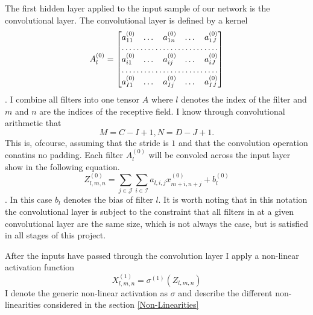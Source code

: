 \documentclass{article}
\begin{document}
The first hidden layer applied to the input sample of our network is the convolutional layer.  The convolutional layer is defined by a kernel 
\begin{equation}
A^{(0)}_l=  \begin{bmatrix}
a^{(0)}_{11}  & \dots & a^{(0)}_{1n}& \dots& a^{(0)}_{1J} \\
\hdotsfor{5} \\
a^{(0)}_{i1}        & \dots& a^{(0)}_{ij} & \dots& a^{(0)}_{iJ}\\
\hdotsfor{5}\\
a^{(0)}_{I1}        & \dots & a^{(0)}_{Ij}& \dots &a^{(0)}_{IJ}
\end{bmatrix}
\end{equation}. I combine all filters into one tensor $A$ where $l$ denotes the index of the filter and $m$ and $n$ are the indices of the receptive field. I know through convolutional arithmetic that 
\begin{equation}
M=C-I+1,
N=D-J+1.
\end{equation} This is, ofcourse, assuming that the stride is $1$ and that the convolution operation conatins no padding.
 Each filter $A^({0})_l$ will be convoled across the input layer show in the following equation.
\begin{equation}
	Z^{(0)}_{l,m,n} = \sum_{j\in \mathcal{J}}\sum_{i \in \mathcal{I}}a_{l,i,j} x^{(0)}_{m+i, n+j}+b^{(0)}_{l}
\end{equation}.  In this case $b_l$ denotes the bias of filter $l$. It is worth noting that in this notation the convolutional layer is subject to the constraint that all filters in at a given convolutional layer are the same size, which is not always the case, but is satisfied in all stages of this project.

After the inputs have passed through the convolution layer I apply a non-linear activation function
\begin{equation}
	X^{(1)}_{l,m,n} = \sigma^{(1)}(Z_{l,m,n})
\end{equation}
I denote the generic non-linear activation as $\sigma$ and describe the different non-linearities considered in the section \ref{Non-Linearities}
\end{document}
